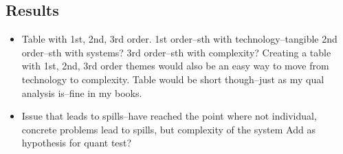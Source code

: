 	\subsection{Results}
	\begin{paracol}{2}
	\begin{itemize}
		\item Table with 1st, 2nd, 3rd order.
			\subitem 1st order--sth with technology--tangible
			\subitem 2nd order--sth with systems?
			\subitem 3rd order--sth with complexity?
		\switchcolumn Creating a table with 1st, 2nd, 3rd order themes would also be an easy way to move from technology to complexity. Table would be short though--just as my qual analysis is--fine in my books.
		\switchcolumn*
		
		\item Issue that leads to spills--have reached the point where not individual, concrete problems lead to spills, but complexity of the system
			\subitem Add as hypothesis for quant test?
	\end{itemize}		
	\end{paracol}